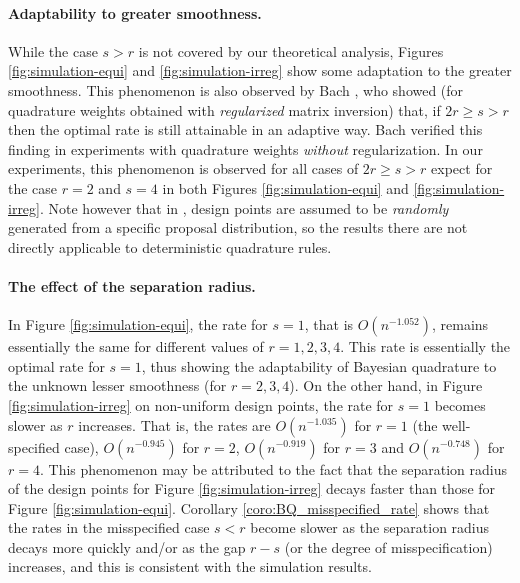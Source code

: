 \documentclass[11pt]{article}
\theoremstyle{remark}
\theoremstyle{example}
\theoremstyle{remark}
\begin{document}
\paragraph{Adaptability to greater smoothness.}
While the case $s > r$ is not covered by our theoretical analysis, Figures \ref{fig:simulation-equi} and \ref{fig:simulation-irreg} show some adaptation to the greater smoothness.
This phenomenon is also observed by Bach \cite[Section 5]{Bac17}, who showed (for quadrature weights obtained with {\em regularized} matrix inversion) that, if $2r \geq s > r$ then the optimal rate is still attainable in an adaptive way. 
Bach \cite[Section 6]{Bac17} verified this finding in experiments with quadrature weights {\em without} regularization. 
In our experiments, this phenomenon is observed for all cases of  $2 r \geq s > r$ expect for the case $r = 2$ and $s = 4$ in both Figures \ref{fig:simulation-equi} and \ref{fig:simulation-irreg}.
Note however that in \cite{Bac17}, design points are assumed to be {\em randomly} generated from a specific proposal distribution, so the results there are not directly applicable to deterministic quadrature rules.



\paragraph{The effect of the separation radius.}
In Figure \ref{fig:simulation-equi}, the rate for $s = 1$, that is $O(n^{-1.052})$, remains essentially the same for different values of $r = 1,2,3,4$.
This rate is essentially the optimal rate for $s = 1$, thus showing the adaptability of Bayesian quadrature to the unknown lesser smoothness (for $r = 2, 3, 4$).
On the other hand, in Figure \ref{fig:simulation-irreg} on non-uniform design points, the rate for $s = 1$ becomes slower as $r$  increases.
That is, the rates are $O(n^{-1.035})$ for $r = 1$ (the well-specified case), $O(n^{-0.945})$ for $r = 2$, $O(n^{-0.919})$ for $r = 3$ and $O(n^{-0.748})$ for $r = 4$.
This phenomenon may be attributed to the fact that the separation radius of the design points for Figure \ref{fig:simulation-irreg} decays faster than those for Figure \ref{fig:simulation-equi}. Corollary \ref{coro:BQ_misspecified_rate} shows that the rates in the misspecified case $s < r$ become slower as the separation radius decays more quickly and/or as the gap $r-s$ (or the degree of misspecification) increases, and this is consistent with the simulation results.
\vspace{-4mm}
\end{document}

